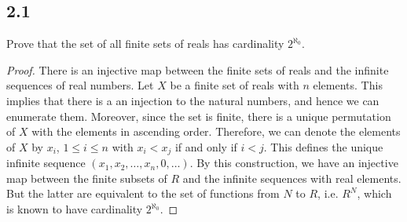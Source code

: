 \subsection*{2.1} Prove that the set of all finite sets of reals has cardinality $2^{\aleph_0}$.

\begin{proof}
There is an injective map between the finite sets of reals and the infinite sequences of real numbers. Let $X$ be a finite set of reals with $n$ elements. This implies that there is a an injection to the natural numbers, and hence we can enumerate them. Moreover, since the set is finite, there is a unique permutation of $X$ with the elements in ascending order. Therefore, we can denote the elements of $X$ by $x_i$, $1 \leq i \leq n$ with $x_i < x_j$ if and only if $i < j$. This defines the unique infinite sequence $(x_1, x_2, \dots, x_n, 0, \dots)$. By this construction, we have an injective map between the finite subsets of $R$ and the infinite sequences with real elements. But the latter are equivalent to the set of functions from $N$ to $R$, i.e. $R^N$, which is known to have cardinality $2^{\aleph_0}$.
\end{proof}

